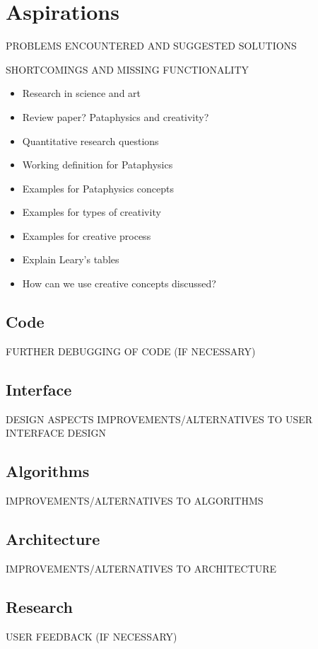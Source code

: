 
\chapter{Aspirations}
\label{ch:future}

PROBLEMS ENCOUNTERED AND SUGGESTED SOLUTIONS

SHORTCOMINGS AND MISSING FUNCTIONALITY

\begin{itemize}
  \item Research in science and art
  \item Review paper? Pataphysics and creativity?
  \item Quantitative research questions
  \item Working definition for Pataphysics
  \item Examples for Pataphysics concepts
  \item Examples for types of creativity
  \item Examples for creative process
  \item Explain Leary's tables
  \item How can we use creative concepts discussed?
\end{itemize}


\section{Code}

FURTHER DEBUGGING OF CODE (IF NECESSARY)

\section{Interface}

DESIGN ASPECTS
IMPROVEMENTS/ALTERNATIVES TO USER INTERFACE DESIGN

\section{Algorithms}

IMPROVEMENTS/ALTERNATIVES TO ALGORITHMS

\section{Architecture}

IMPROVEMENTS/ALTERNATIVES TO ARCHITECTURE

\section{Research}

USER FEEDBACK (IF NECESSARY)
